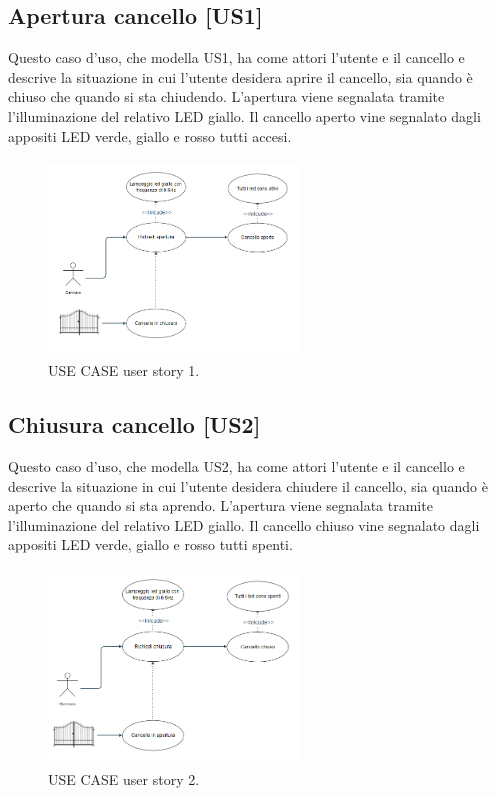 \documentclass[12pt]{article}
\begin{document}
\subsection{Apertura cancello [US1]}
Questo caso d'uso, che modella US1, ha come attori l'utente e il cancello e descrive la situazione in cui l'utente desidera aprire il cancello, sia quando è chiuso che quando si sta chiudendo. L'apertura viene segnalata tramite l'illuminazione del relativo LED giallo. Il cancello aperto vine segnalato dagli appositi LED verde, giallo e rosso tutti accesi.
    \begin{figure}[H]
        \centering
        \includegraphics[width=0.6\textwidth,height=5.2cm]{use_case_us1.PNG}
        \caption{USE CASE user story 1.}
        \label{fig:use_case_us1}
    \end{figure}
    
\subsection{Chiusura cancello [US2]}
Questo caso d'uso, che modella US2, ha come attori l'utente e il cancello e descrive la situazione in cui l'utente desidera chiudere il cancello, sia quando è aperto che quando si sta aprendo. L'apertura viene segnalata tramite l'illuminazione del relativo LED giallo. Il cancello chiuso vine segnalato dagli appositi LED verde, giallo e rosso tutti spenti.
\begin{figure}[H]
    \centering
    \includegraphics[width=0.6\textwidth,height=5.2cm]{use_case_us2.PNG}
    \caption{USE CASE user story 2.}
    \label{fig:use_case_us2}
\end{figure}
\end{document}
